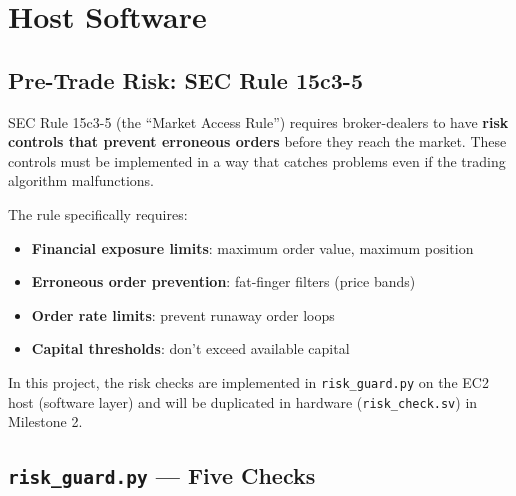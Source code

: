 \documentclass[11pt,a4paper]{article}
\begin{document}
\section{Host Software}

\subsection{Pre-Trade Risk: SEC Rule 15c3-5}

SEC Rule 15c3-5 (the ``Market Access Rule'') requires broker-dealers to have
\textbf{risk controls that prevent erroneous orders} before they reach the market.
These controls must be implemented in a way that catches problems even if the
trading algorithm malfunctions.

The rule specifically requires:
\begin{itemize}[itemsep=2pt]
  \item \textbf{Financial exposure limits}: maximum order value, maximum position
  \item \textbf{Erroneous order prevention}: fat-finger filters (price bands)
  \item \textbf{Order rate limits}: prevent runaway order loops
  \item \textbf{Capital thresholds}: don't exceed available capital
\end{itemize}

In this project, the risk checks are implemented in \texttt{risk\_guard.py}
on the EC2 host (software layer) and will be duplicated in hardware
(\texttt{risk\_check.sv}) in Milestone 2.

\subsection{\texttt{risk\_guard.py} --- Five Checks}
\end{document}
